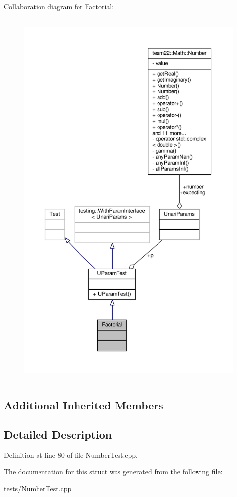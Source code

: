 Collaboration diagram for Factorial\+:
\nopagebreak
\begin{figure}[H]
\begin{center}
\leavevmode
\includegraphics[height=550pt]{struct_factorial__coll__graph}
\end{center}
\end{figure}
\subsection*{Additional Inherited Members}


\subsection{Detailed Description}


Definition at line 80 of file Number\+Test.\+cpp.



The documentation for this struct was generated from the following file\+:\begin{DoxyCompactItemize}
\item 
tests/\hyperlink{_number_test_8cpp}{Number\+Test.\+cpp}\end{DoxyCompactItemize}
